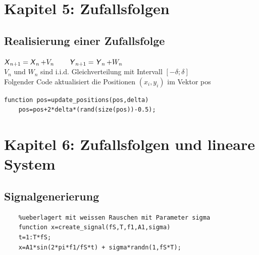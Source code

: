 \documentclass[deutsch]{latex4ei/latex4ei_sheet}
\begin{document}
\section{Kapitel 5: Zufallsfolgen}
\begin{sectionbox}
	\subsection{Realisierung einer Zufallsfolge}
	$\operatorname{\textsf{\textit{X}}}_{n+1}=\operatorname{\textsf{\textit{X}}}_n+V_n \qquad \operatorname{\textsf{\textit{Y}}}_{n+1}=\operatorname{\textsf{\textit{Y}}}_n+W_n$ \\
	$V_n$ und $W_n$ sind i.i.d. Gleichverteilung mit Intervall $[-\delta;\delta]$\\
	Folgender Code aktualisiert die Positionen $(x_i,y_i)$ im Vektor pos
	\begin{lstlisting}[gobble=4]
	function pos=update_positions(pos,delta)
	pos=pos+2*delta*(rand(size(pos))-0.5);
	\end{lstlisting}
\end{sectionbox}

\section{Kapitel 6: Zufallsfolgen und lineare System}
\begin{sectionbox}
	\subsection{Signalgenerierung}
	\begin{lstlisting}[gobble=4]
	%Erstellt Sinussignal der Frequenz f1 mit der Amplitude A1,
	%ueberlagert mit weissen Rauschen mit Parameter sigma
	function x=create_signal(fS,T,f1,A1,sigma)
	t=1:T*fS;
	x=A1*sin(2*pi*f1/fS*t) + sigma*randn(1,fS*T);
	\end{lstlisting}
\end{sectionbox}

\end{document}
